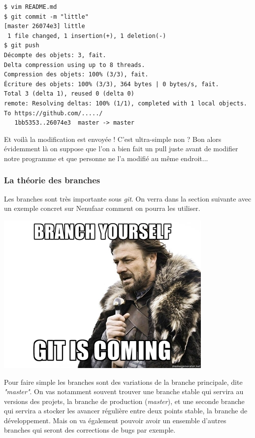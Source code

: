 \documentclass[12pt,a4paper]{article}
\begin{document}
\begin{verbatim}
$ vim README.md 
$ git commit -m "little"
[master 26074e3] little
 1 file changed, 1 insertion(+), 1 deletion(-)
$ git push
Décompte des objets: 3, fait.
Delta compression using up to 8 threads.
Compression des objets: 100% (3/3), fait.
Écriture des objets: 100% (3/3), 364 bytes | 0 bytes/s, fait.
Total 3 (delta 1), reused 0 (delta 0)
remote: Resolving deltas: 100% (1/1), completed with 1 local objects.
To https://github.com/...../
   1bb5353..26074e3  master -> master
\end{verbatim}

Et voilà la modification est envoyée ! C'est ultra-simple non ? Bon alors évidemment là on suppose que l'on a bien fait un pull juste avant de modifier notre programme et que personne ne l'a modifié au même endroit...

\subsubsection{La théorie des branches}

\begin{minipage}{0.7\linewidth}
Les branches sont très importante sous \emph{git}. On verra dans la section suivante avec un exemple concret sur Nenufaar comment on pourra les utiliser.
\end{minipage}\hfill
\begin{minipage}{0.25\linewidth}
\includegraphics[width=\linewidth]{branch}
\end{minipage}

Pour faire simple les branches sont des variations de la branche principale, dite \emph{"master"}. On vas notamment souvent trouver une branche stable qui servira au versions des projets, la branche de production (\emph{master}), et une seconde branche qui servira a stocker les avancer régulière entre deux points stable, la branche de développement. Mais on va également pouvoir avoir un ensemble d'autres branches qui seront des corrections de bugs par exemple.
\end{document}
